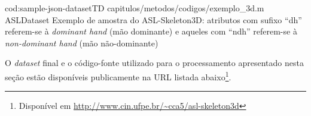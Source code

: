 \codigo
    {cod:sample-json-datasetTD}
    {capitulos/metodos/codigos/exemplo_3d.m}
    {ASLDataset}
    {Exemplo de amostra do ASL-Skeleton3D: atributos com sufixo ``dh'' referem-se à \textit{dominant hand} (mão dominante) e aqueles com ``ndh'' referem-se à \textit{non-dominant hand} (mão não-dominante)}
    {}

O \textit{dataset} final e o código-fonte utilizado para o processamento apresentado nesta seção estão disponíveis publicamente na URL listada abaixo\footnote{Disponível em \url{http://www.cin.ufpe.br/~cca5/asl-skeleton3d}}.
